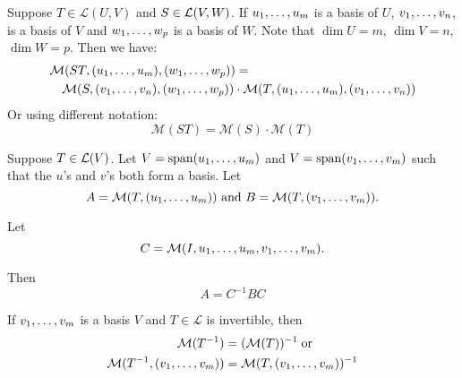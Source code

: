   \begin{thm} 
    Suppose $T\in \mathcal{L}(U,V)$ and $S\in {\mathcal{L}(V,W)}$. If $u_1, \dots, u_m$ is a basis of $U$, $v_1, \dots, v_n$, is a basis of $V$ and $w_1, \dots, w_{p}$ is a basis of $W$. Note that $\dim U = m$, $\dim V = n$, $\dim W = p$. Then we have:
    \begin{equation}
    \begin{aligned}
      &\mathcal{M}(ST, (u_1, \dots, u_m), (w_1, \dots, w_{p})) = \\
      &\quad \mathcal{M}(S, (v_1, \dots, v_n), (w_1, \dots, w_{p} ))
      \cdot
      \mathcal{M}(T, (u_1, \dots, u_m), (v_1, \dots, v_n   ))
    \end{aligned}
    \end{equation}
    Or using different notation:
    \begin{equation}
      \mathcal{M}(ST) = \mathcal{M}(S) \cdot \mathcal{M}(T)
    \end{equation}
  \end{thm}

  \setcounter{thm}{83}
  \begin{thm}
    Suppose $T \in \mathcal{L}(V)$. Let
    $V = \operatorname{span} (u_1, \dots, u_m)$ and $V= \operatorname{span} (v_1, \dots, v_m)$ such that the $u$'s and $v$'s both form a basis. Let 
    \begin{equation}
      A=\mmatrix(T, (\onetillm{u}))$ and $B=\mmatrix(T,(\onetillm{v})). 
    \end{equation}
    
    Let
    \begin{equation}
      C=\mathcal{M}(I, u_1, \dots, u_m, v_1, \dots, v_m).
    \end{equation} 
    
    Then
    \begin{equation}
    A = C^{-1} B C
    \end{equation}
  \end{thm}

  \setcounter{thm}{85}
  \begin{thm}
    If $v_1, \dots, v_m$ is a basis $V$ and $T\in \mathcal{L}$ is invertible, then
    \begin{equation}
      \begin{aligned}
        \mathcal{M}(T^{-1}) & = (\mathcal{M}(T))^{-1} \; \text{or} \\
        \mathcal{M}(T^{-1}, (v_1, \dots, v_m)) & =\mathcal{M}(T, (v_1, \dots, v_m))^{-1}
      \end{aligned}
    \end{equation}
  \end{thm}